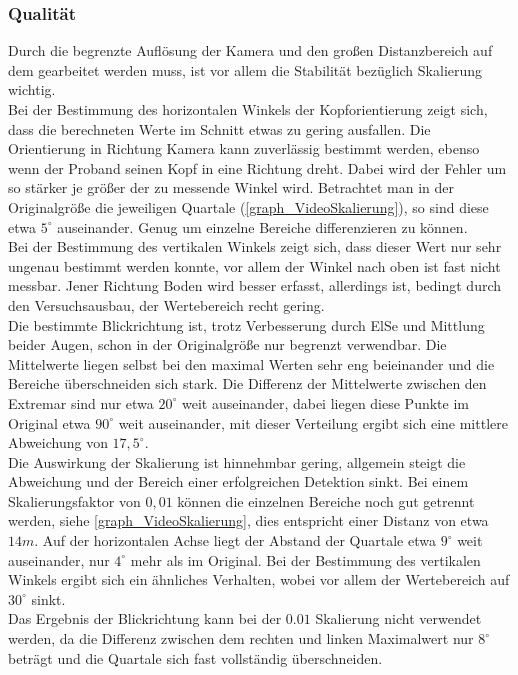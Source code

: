 \subsubsection{Qualität}
Durch die begrenzte Auflösung der Kamera und den großen Distanzbereich auf dem gearbeitet werden muss, ist vor allem die Stabilität bezüglich Skalierung wichtig.\\
Bei der Bestimmung des horizontalen Winkels der Kopforientierung zeigt sich, dass die berechneten Werte im Schnitt etwas zu gering ausfallen. Die Orientierung in Richtung Kamera kann zuverlässig bestimmt werden, ebenso wenn der Proband seinen Kopf in eine Richtung dreht. Dabei wird der Fehler um so stärker je größer der zu messende Winkel wird. Betrachtet man in der Originalgröße die jeweiligen Quartale (\autoref{graph_VideoSkalierung}), so sind diese etwa $5^\circ$ auseinander. Genug um einzelne Bereiche differenzieren zu können.\\
Bei der Bestimmung des vertikalen Winkels zeigt sich, dass dieser Wert nur sehr ungenau bestimmt werden konnte, vor allem der Winkel nach oben ist fast nicht messbar. Jener Richtung Boden wird besser erfasst, allerdings ist, bedingt durch den Versuchsausbau, der Wertebereich recht gering.\\
Die bestimmte Blickrichtung ist, trotz Verbesserung durch ElSe und Mittlung beider Augen, schon in der Originalgröße nur begrenzt verwendbar. Die Mittelwerte liegen selbst bei den maximal Werten sehr eng beieinander und die Bereiche überschneiden sich stark. Die Differenz der Mittelwerte zwischen den Extremar sind nur etwa $20^\circ$ weit auseinander, dabei liegen diese Punkte im Original etwa $90^\circ$ weit auseinander, mit dieser Verteilung ergibt sich eine mittlere Abweichung von $17,5^\circ$. \\
Die Auswirkung der Skalierung ist hinnehmbar gering, allgemein steigt die Abweichung und der Bereich einer erfolgreichen Detektion sinkt. Bei einem Skalierungsfaktor von $0,01$ können die einzelnen Bereiche noch gut getrennt werden, siehe \autoref{graph_VideoSkalierung}, dies entspricht einer Distanz von etwa $14m$. Auf der horizontalen Achse liegt der Abstand der Quartale etwa $9^\circ$ weit auseinander, nur $4^\circ$ mehr als im Original. Bei der Bestimmung des vertikalen Winkels ergibt sich ein ähnliches Verhalten, wobei vor allem der Wertebereich auf $30^\circ$ sinkt.\\
Das Ergebnis der Blickrichtung kann bei der $0.01$ Skalierung nicht verwendet werden, da die Differenz zwischen dem rechten und linken Maximalwert nur $8^\circ$ beträgt und die Quartale sich fast vollständig überschneiden.\\
